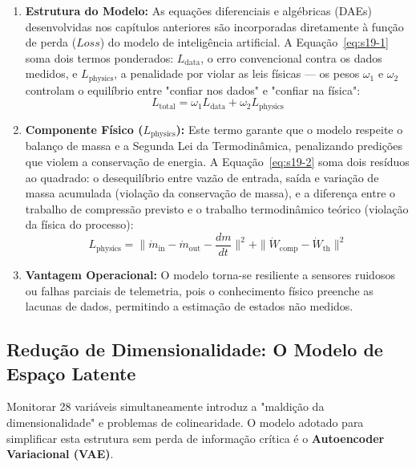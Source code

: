 \documentclass[12pt,a4paper]{article}
\numberwithin{equation}{section}
\numberwithin{table}{section}
\numberwithin{figure}{section}
\begin{document}
\begin{enumerate}
	\item \textbf{Estrutura do Modelo:}
	As equações diferenciais e algébricas (DAEs) desenvolvidas nos capítulos anteriores são incorporadas diretamente à função de perda ($Loss$) do modelo de inteligência artificial. A Equação~\eqref{eq:s19-1} soma dois termos ponderados: $L_{\text{data}}$, o erro convencional contra os dados medidos, e $L_{\text{physics}}$, a penalidade por violar as leis físicas — os pesos $\omega_1$ e $\omega_2$ controlam o equilíbrio entre "confiar nos dados" e "confiar na física":
	\begin{equation}\label{eq:s19-1}
 L_{\text{total}} = \omega_1 L_{\text{data}} + \omega_2 L_{\text{physics}}
\end{equation}

	\item \textbf{Componente Físico ($L_{\text{physics}}$):}
	Este termo garante que o modelo respeite o balanço de massa e a Segunda Lei da Termodinâmica, penalizando predições que violem a conservação de energia. A Equação~\eqref{eq:s19-2} soma dois resíduos ao quadrado: o desequilíbrio entre vazão de entrada, saída e variação de massa acumulada (violação da conservação de massa), e a diferença entre o trabalho de compressão previsto e o trabalho termodinâmico teórico (violação da física do processo):
	\begin{equation}\label{eq:s19-2}
 L_{\text{physics}} = \| \dot{m}_{\text{in}} - \dot{m}_{\text{out}} - \frac{dm}{dt} \|^2 + \| \dot{W}_{\text{comp}} - \dot{W}_{\text{th}} \|^2
\end{equation}
	
	\item \textbf{Vantagem Operacional:}
	O modelo torna-se resiliente a sensores ruidosos ou falhas parciais de telemetria, pois o conhecimento físico preenche as lacunas de dados, permitindo a estimação de estados não medidos.
\end{enumerate}

\subsection{Redução de Dimensionalidade: O Modelo de Espaço Latente}

Monitorar 28 variáveis simultaneamente introduz a "maldição da dimensionalidade" e problemas de colinearidade. O modelo adotado para simplificar esta estrutura sem perda de informação crítica é o \textbf{Autoencoder Variacional (VAE)}.
\end{document}

